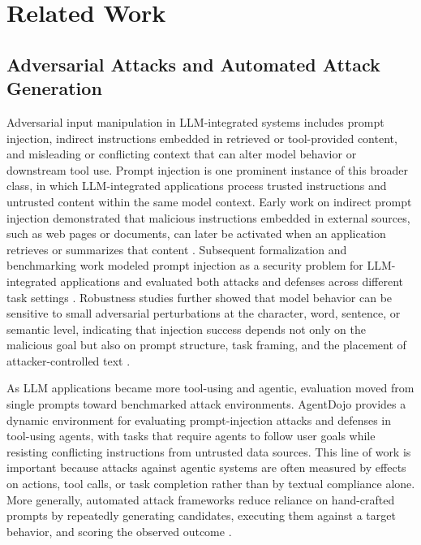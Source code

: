 \section{Related Work}

\subsection{Adversarial Attacks and Automated Attack Generation}
Adversarial input manipulation in LLM-integrated systems includes prompt injection, indirect instructions embedded in retrieved or tool-provided content, and misleading or conflicting context that can alter model behavior or downstream tool use. Prompt injection is one prominent instance of this broader class, in which LLM-integrated applications process trusted instructions and untrusted content within the same model context.
Early work on indirect prompt injection demonstrated that
malicious instructions embedded in external sources, such as web pages or
documents, can later be activated when an application retrieves or summarizes
that content \cite{greshake2023indirect}. Subsequent formalization and
benchmarking work modeled prompt injection as a security problem for
LLM-integrated applications and evaluated both attacks and defenses across
different task settings \cite{liu2024formalizing}. Robustness studies further
showed that model behavior can be sensitive to small adversarial perturbations
at the character, word, sentence, or semantic level, indicating that injection
success depends not only on the malicious goal but also on prompt structure,
task framing, and the placement of attacker-controlled text \cite{zhu2023promptrobust}.

As LLM applications became more tool-using and agentic, evaluation moved from
single prompts toward benchmarked attack environments. AgentDojo \cite{agentdojo2024} provides a
dynamic environment for evaluating prompt-injection attacks and defenses in
tool-using agents, with tasks that require agents to follow user goals while
resisting conflicting instructions from untrusted data sources.
This line of work is important because attacks against
agentic systems are often measured by effects on actions, tool calls, or task
completion rather than by textual compliance alone. More generally, automated
attack frameworks reduce reliance on hand-crafted prompts by repeatedly
generating candidates, executing them against a target behavior, and scoring
the observed outcome \cite{liu2024formalizing,agentdojo2024}.

